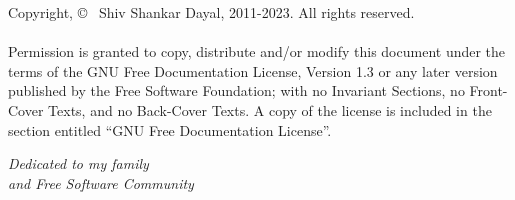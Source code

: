 \documentclass[9pt, oneside]{memoir}
\title{\sffamily\color{cyan}\HUGE{\textbf{A Variable in Algebra}}}
\author{\vspace*{1cm}\LARGE{Shiv S. Dayal}}
\date{}
\begin{document}
\minitoc
\minilof
\minilot
\maketitle
\thispagestyle{empty}
\pagestyle{empty}
\vfill
\newpage
\vspace*{6in}
Copyright, \copyright~ Shiv Shankar Dayal, 2011-2023. All rights reserved.\\\\
Permission is granted to copy, distribute and/or modify this document under the
terms of the GNU Free Documentation License, Version 1.3 or any later version
published by the Free Software Foundation; with no Invariant Sections, no
Front-Cover Texts, and no Back-Cover Texts. A copy of the license is included
in the section entitled ``GNU Free Documentation License''.
\newpage
\vspace*{2in}
\begin{center}
  \Large \it Dedicated to my family\\and Free Software Community
\end{center}
\newpage
\setcounter{page}{1}
\tableofcontents
\newpage
\listoffigures
\newpage
\listoftables
\newpage
\pagestyle{fancy}
\frontmatter
\setcounter{page}{1}

\newpage
\mainmatter
{}

\backmatter

\printindex
\end{document}
